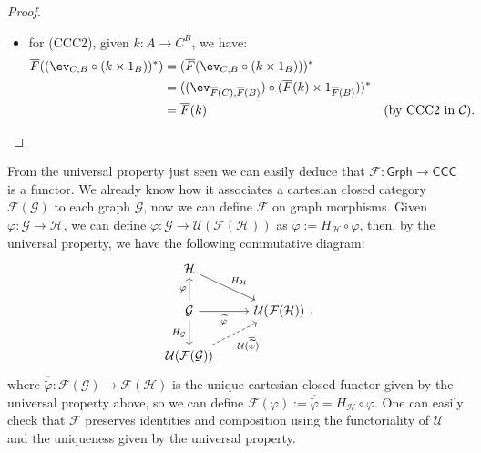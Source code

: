 \begin{proof}
\begin{itemize}
\begin{itemize}[label=$\ast$]
            \item for (CCC2), given $k : A \to C^B$, we have:
            \begin{align*}
                \overline F((\ev_{C,B} \circ (k \times 1_B))^*) &= (\overline F(\ev_{C,B} \circ (k \times 1_B)))^* \\
                                                                 &= ((\ev_{\overline F(C),\overline F(B)}) \circ (\overline F(k) \times 1_{\overline F(B)}))^* \\
                                                                 &= \overline F(k) &&(\textnormal{by CCC2 in $\mathcal C$}).
            \end{align*}
        \end{itemize}
    \end{itemize}
\end{proof}

\begin{remark}
    From the universal property just seen we can easily deduce that $\mathcal F : \mathsf{Grph} \to \mathsf{CCC}$ is a functor. We already know how it associates a cartesian closed category $\mathcal F(\mathcal G)$ to each graph $\mathcal G$, 
    now we can define $\mathcal F$ on graph morphisms. Given $\varphi : \mathcal G \to \mathcal H$, we can define $\widetilde{\varphi} : \mathcal G \to \mathcal U(\mathcal F(\mathcal H))$ as $\widetilde{\varphi} := H_\mathcal H \circ \varphi$, then, by the universal property, we have the following commutative diagram:
    \[\begin{tikzcd}
        {\mathcal H} & \\
        {\mathcal G} & {\mathcal U(\mathcal F(\mathcal H))} \\
        {\mathcal U(\mathcal F(\mathcal G))}
        \arrow["{H_{\mathcal H}}", from=1-1, to=2-2]
        \arrow["\varphi", from=2-1, to=1-1]
        \arrow["{\widetilde{\varphi}}"', from=2-1, to=2-2]
        \arrow["{H_{\mathcal G}}"', from=2-1, to=3-1]
        \arrow["{\mathcal{U}(\overline{\widetilde{\varphi}})}"', dashed, from=3-1, to=2-2]
    \end{tikzcd},\]
where $\overline{\widetilde{\varphi}} : \mathcal F(\mathcal G) \to \mathcal F(\mathcal H)$ is the unique cartesian closed functor given by the universal property above, so we can define $\mathcal F(\varphi) := \overline{\widetilde{\varphi}} = \overline{H_\mathcal H \circ \varphi}$. One can 
easily check that $\mathcal F$ preserves identities and composition using the functoriality of $\mathcal U$ and the uniqueness given by the universal property. 
\end{remark}

